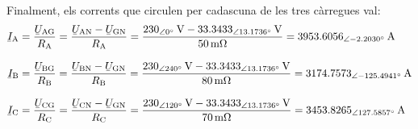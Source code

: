 \begin{exemple}
    Finalment, els corrents que circulen per cadascuna de les tres càrregues val:
    \begin{align*}
    \cmplx{I}\ped{A} &= \frac{\cmplx{U}\ped{AG}}{R\ped{A}} = \frac{\cmplx{U}\ped{AN} - \cmplx{U}\ped{GN}}{R\ped{A}} = \frac{\SIpd{230}{0}{V}-\SIpd{33,3433}{13,1736}{V}}{\SI{50}{m\ohm}}
    = \SIpd{3953,6056}{-2,2030}{A}\\[2ex]
    \cmplx{I}\ped{B} &= \frac{\cmplx{U}\ped{BG}}{R\ped{B}} = \frac{\cmplx{U}\ped{BN} - \cmplx{U}\ped{GN}}{R\ped{B}} = \frac{\SIpd{230}{240}{V}-\SIpd{33,3433}{13,1736}{V}}{\SI{80}{m\ohm}}
    = \SIpd{3174,7573}{-125,4941}{A}\\[2ex]
    \cmplx{I}\ped{C} &= \frac{\cmplx{U}\ped{CG}}{R\ped{C}} = \frac{\cmplx{U}\ped{CN} - \cmplx{U}\ped{GN}}{R\ped{C}} = \frac{\SIpd{230}{120}{V}-\SIpd{33,3433}{13,1736}{V}}{\SI{70}{m\ohm}}
    = \SIpd{3453,8265}{127,5857}{A}
    \end{align*}
\end{exemple}


